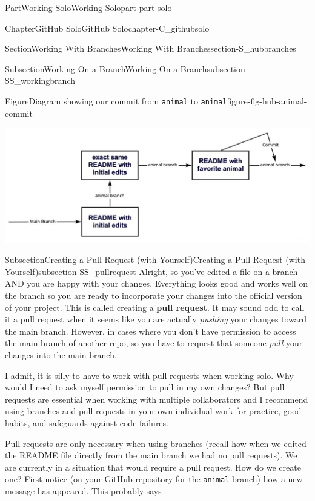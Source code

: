 \documentclass[twoside,10pt,]{book}
\newcommand{\mono}[1]{\texttt{#1}}
\newcommand{\terminology}[1]{\textbf{#1}}
\begin{document}
\begin{partptx}{Part}{Working Solo}{}{Working Solo}{}{}{part-part-solo}
\begin{chapterptx}{Chapter}{GitHub Solo}{}{GitHub Solo}{}{}{chapter-C_githubsolo}
\begin{sectionptx}{Section}{Working With Branches}{}{Working With Branches}{}{}{section-S_hubbranches}
\begin{subsectionptx}{Subsection}{Working On a Branch}{}{Working On a Branch}{}{}{subsection-SS_workingbranch}
\begin{figureptx}{Figure}{Diagram showing our commit from \mono{animal} to \mono{animal}}{figure-fig-hub-animal-commit}{}
\begin{image}{0.05}{0.9}{0.05}{}
\includegraphics[width=\linewidth]{external/hub_animal_commit.pdf}
\end{image}%
\tcblower
\end{figureptx}%
\end{subsectionptx}
%
%
\typeout{************************************************}
\typeout{************************************************}
%
\begin{subsectionptx}{Subsection}{Creating a Pull Request (with Yourself)}{}{Creating a Pull Request (with Yourself)}{}{}{subsection-SS_pullrequest}
%
%
%
%
Alright, so you've edited a file on a branch AND you are happy with your changes. Everything looks good and works well on the branch so you are ready to incorporate your changes into the official version of your project. This is called creating a \terminology{pull request}. It may sound odd to call it a pull request when it seems like you are actually \emph{pushing} your changes toward the main branch. However, in cases where you don't have permission to access the main branch of another repo, so you have to request that someone \emph{pull} your changes into the main branch.%
\par
I admit, it is silly to have to work with pull requests when working solo. Why would I need to ask myself permission to pull in my own changes? But pull requests are essential when working with multiple collaborators and I recommend using branches and pull requests in your own individual work for practice, good habits, and safeguards against code failures.%
\par
{} Pull requests are only necessary when using branches (recall how when we edited the README file directly from the main branch we had no pull requests). We are currently in a situation that would require a pull request. How do we create one? First notice (on your GitHub repository for the \mono{animal} branch) how a new message has appeared. This probably says%

\end{subsectionptx}
\end{sectionptx}
\end{chapterptx}
\end{partptx}
\end{document}

